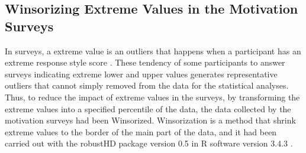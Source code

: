 

\subsection{Winsorizing Extreme Values in the Motivation Surveys}
\label{subsec:winsorizing-motivation-survey}

In surveys, a extreme value is an outliers that happens when a participant has an extreme response style score \cite{Lavrakas2008}. These tendency of some participants to answer surveys indicating extreme lower and upper values generates representative outliers that cannot simply removed from the data for the statistical analyses. Thus, to reduce the impact of extreme values in the surveys, by transforming the extreme values into a specified percentile of the data, the data collected by the motivation surveys had been Winsorized. Winsorization is a method that shrink extreme values to the border of the main part of the data, and it had been carried out with the robustHD package version 0.5 \cite{Alfons2016} in R software version 3.4.3 \cite{RCoreTeam2017}.


